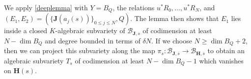 \documentclass[10pt]{article}
\numberwithin{equation}{section}
\theoremstyle{plain}
\theoremstyle{definition}
\theoremstyle{remark}
\begin{document}


We apply \autoref{deeplemma} with $Y = B_{Q}$, the relations $u^{*} R_{0}, \hdots, u^{*} R_{N}$, and $(E_{1}, E_{2}) = (\{ \mathbf{J}(a_{j}(s)) \}_{0 \leq j \leq N}, Q)$. The lemma then shows that $E_{1}$ lies inside a closed $K$-algebraic subvariety of $\mathcal{B}_{\mathbf{J},s}$ of codimension at least $N - \dim B_{Q}$ and degree bounded in terms of $\delta N$. If we choose $N \geq \dim B_{Q} + 2$, then we can project this subvariety along the map $\pi_{s} : \mathcal{B}_{\mathbf{J},s} \to \mathcal{B}_{\mathbf{H},s}$ to obtain an algebraic subvariety $T_{s}$ of codimension at least $N - \dim B_{Q} - 1$ which vanishes on $\mathbf{H}(s)$.
\end{document}
